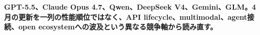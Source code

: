 \noindent\textbf{GPT-5.5、Claude Opus 4.7、Qwen、DeepSeek V4、Gemini、GLM。4月の更新を一列の性能順位ではなく、API lifecycle、multimodal、agent接続、open ecosystemへの波及という異なる競争軸から読み直す。}\autocite{src-9156c37fb1c2,src-a24fd97eb3d0,src-dfe7e0c6ff39,src-e547d0d8cbe3,src-eac8dfbeb78c,src-f6aa679babd7}
